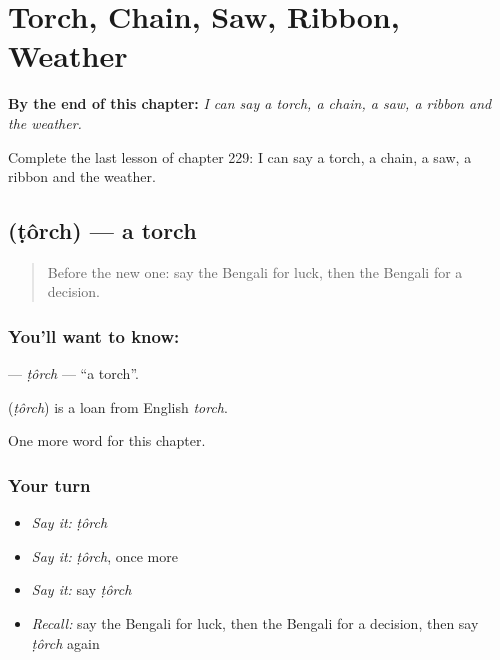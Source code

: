 
\chapter{Torch, Chain, Saw, Ribbon, Weather}
\label{ch:bn-torch-chain-saw-ribbon-weather}

\begin{chapteropening}
\textbf{By the end of this chapter:} \emph{I can say a torch, a chain, a saw, a ribbon and the weather.}

Complete the last lesson of chapter 229: I can say a torch, a chain, a saw, a ribbon and the weather.
\end{chapteropening}

\section[\texorpdfstring{\bn{টর্চ} (ṭôrch)}{টর্চ (ṭôrch)}]{ (ṭôrch) — a torch}

\label{lesson:BN-C229-torch}



\begin{quote}
Before the new one: say the Bengali for luck, then the Bengali for a decision.
\end{quote}

\subsection*{You'll want to know: }
\textbf{} — \emph{ṭôrch} — \textquotedblleft{}a torch\textquotedblright{}.

\begin{cousinweb}
\textbf{} (\emph{ṭôrch}) is a loan from English \emph{torch}.
\end{cousinweb}

\begin{grammarlens}[title={What you've built}]
One more word for this chapter.
\end{grammarlens}

\subsection*{Your turn}
\begin{itemize}
\raggedright
  \item \emph{Say it:} \emph{ṭôrch}
  \item \emph{Say it:} \emph{ṭôrch}, once more
  \item \emph{Say it:} say \emph{ṭôrch}
  \item \emph{Recall:} say the Bengali for luck, then the Bengali for a decision, then say \emph{ṭôrch} again
\end{itemize}

